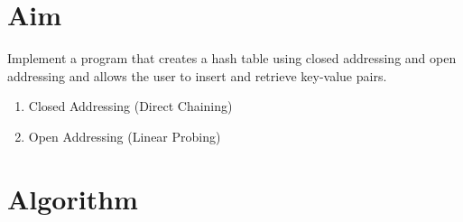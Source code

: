 
\section{Aim}
Implement a program that creates a hash table using closed addressing and open addressing and allows the user to insert and retrieve key-value pairs.
\begin{enumerate}
  \item Closed Addressing (Direct Chaining)
  \item Open Addressing (Linear Probing)
\end{enumerate}

\section{Algorithm}
